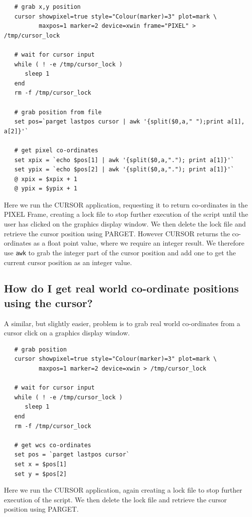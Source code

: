 \documentclass[twoside,11pt]{article}
\newcommand{\xref}[3]{#1}
\begin{document}
\small\begin{verbatim}
   # grab x,y position
   cursor showpixel=true style="Colour(marker)=3" plot=mark \
          maxpos=1 marker=2 device=xwin frame="PIXEL" > /tmp/cursor_lock

   # wait for cursor input
   while ( ! -e /tmp/cursor_lock ) 
      sleep 1
   end
   rm -f /tmp/cursor_lock

   # grab position from file
   set pos=`parget lastpos cursor | awk '{split($0,a," ");print a[1], a[2]}'`

   # get pixel co-ordinates
   set xpix = `echo $pos[1] | awk '{split($0,a,"."); print a[1]}'`
   set ypix = `echo $pos[2] | awk '{split($0,a,"."); print a[1]}'`
   @ xpix = $xpix + 1
   @ ypix = $ypix + 1
\end{verbatim}\normalsize

Here we run the \xref{CURSOR}{sun95}{CURSOR} application, requesting it to return co-ordinates in the \xref{PIXEL Frame}{sun95}{se_wcsuse}, creating a lock file to stop further execution of the script until the user has clicked on the graphics display window. We then delete the lock file and retrieve the cursor position using \xref{PARGET}{sun95}{PARGET}. However CURSOR returns the co-ordinates as a float point value, where we require an integer result. We therefore use {\tt awk} to grab the integer part of the cursor position and add one to get the current cursor position as an integer value.

\subsection{How do I get real world co-ordinate positions using the cursor?}

A similar, but slightly easier, problem is to grab real world co-ordinates from a cursor click on a graphics display window. 

\small\begin{verbatim}
   # grab position
   cursor showpixel=true style="Colour(marker)=3" plot=mark \
          maxpos=1 marker=2 device=xwin > /tmp/cursor_lock

   # wait for cursor input	  
   while ( ! -e /tmp/cursor_lock ) 
      sleep 1
   end
   rm -f /tmp/cursor_lock
   
   # get wcs co-ordinates
   set pos = `parget lastpos cursor`
   set x = $pos[1]
   set y = $pos[2]
\end{verbatim}\normalsize

Here we run the \xref{CURSOR}{sun95}{CURSOR} application, again creating a lock file to stop further execution of the script. We then delete the lock file and retrieve the cursor position using \xref{PARGET}{sun95}{PARGET}.
\end{document}
